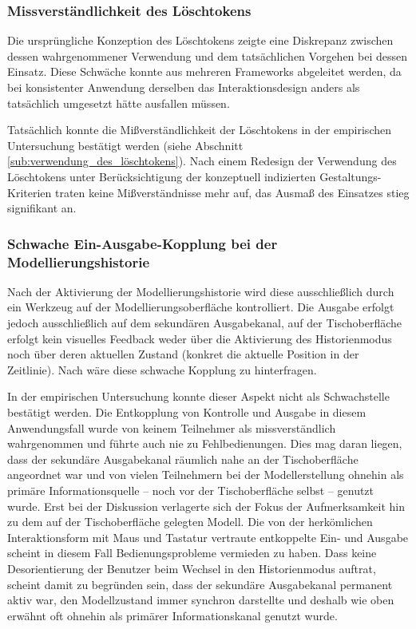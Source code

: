 \subsubsection{Missverständlichkeit des Löschtokens}

Die ursprüngliche Konzeption des Löschtokens zeigte eine Diskrepanz zwischen dessen wahrgenommener Verwendung und dem tatsächlichen Vorgehen bei dessen Einsatz. Diese Schwäche konnte aus mehreren Frameworks abgeleitet werden, da bei konsistenter Anwendung derselben das Interaktionsdesign anders als tatsächlich umgesetzt hätte ausfallen müssen.

Tatsächlich konnte die Mißverständlichkeit der Löschtokens in der empirischen Untersuchung bestätigt werden (siehe Abschnitt \ref{sub:verwendung_des_löschtokens}). Nach einem Redesign der Verwendung des Löschtokens unter Berücksichtigung der konzeptuell indizierten Gestaltungs-Kriterien traten keine Mißverständnisse mehr auf, das Ausmaß des Einsatzes stieg signifikant an.


\subsubsection{Schwache Ein-Ausgabe-Kopplung bei der Modellierungshistorie}

Nach der Aktivierung der Modellierungshistorie wird diese ausschließlich durch ein Werkzeug auf der Modellierungsoberfläche kontrolliert. Die Ausgabe erfolgt jedoch ausschließlich auf dem sekundären Ausgabekanal, auf der Tischoberfläche erfolgt kein visuelles Feedback weder über die Aktivierung des Historienmodus noch über deren aktuellen Zustand (konkret die aktuelle Position in der Zeitlinie). Nach \citep{Ullmer00} wäre diese schwache Kopplung zu hinterfragen.

In der empirischen Untersuchung konnte dieser Aspekt nicht als Schwachstelle bestätigt werden. Die Entkopplung von Kontrolle und Ausgabe in diesem Anwendungsfall wurde von keinem Teilnehmer als missverständlich wahrgenommen und führte auch nie zu Fehlbedienungen. Dies mag daran liegen, dass der sekundäre Ausgabekanal räumlich nahe an der Tischoberfläche angeordnet war und von vielen Teilnehmern bei der Modellerstellung ohnehin als primäre Informationsquelle -- noch vor der Tischoberfläche selbst -- genutzt wurde. Erst bei der Diskussion verlagerte sich der Fokus der Aufmerksamkeit hin zu dem auf der Tischoberfläche gelegten Modell. Die von der herkömlichen Interaktionsform mit Maus und Tastatur vertraute entkoppelte Ein- und Ausgabe scheint in diesem Fall Bedienungsprobleme vermieden zu haben. Dass keine Desorientierung der Benutzer beim Wechsel in den Historienmodus auftrat, scheint damit zu begründen sein, dass der sekundäre Ausgabekanal permanent aktiv war, den Modellzustand immer synchron darstellte und deshalb wie oben erwähnt oft ohnehin als primärer Informationskanal genutzt wurde.  

